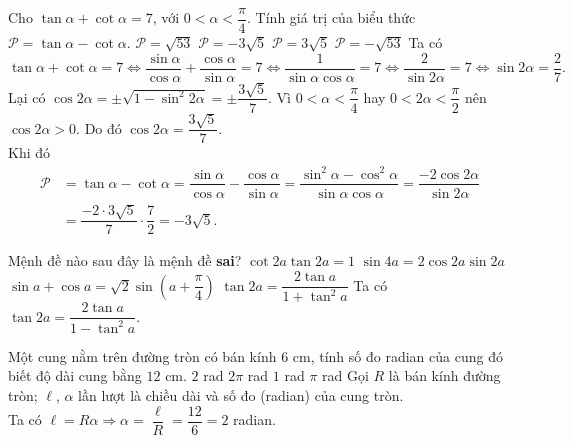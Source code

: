 \begin{ex}%
 Cho $\tan \alpha + \cot \alpha = 7$, với $0 < \alpha < \dfrac{\pi}{4}$. Tính giá trị của biểu thức $\mathscr{P} = \tan \alpha - \cot \alpha$.
 \choice
  {$\mathscr{P} = \sqrt{53}$}
  {\True $\mathscr{P} = -3\sqrt{5}$}
  {$\mathscr{P} = 3\sqrt{5}$}
  {$\mathscr{P} = -\sqrt{53}$}
 \loigiai
 {
 Ta có
 $$\tan \alpha + \cot \alpha = 7 \Leftrightarrow \dfrac{\sin \alpha}{\cos \alpha} + \dfrac{\cos \alpha}{\sin \alpha} = 7 \Leftrightarrow \dfrac{1}{\sin \alpha \cos \alpha} = 7 \Leftrightarrow \dfrac{2}{\sin 2 \alpha} = 7 \Leftrightarrow \sin 2 \alpha = \dfrac{2}{7}.$$
 Lại có $\cos 2\alpha = \pm \sqrt{1 - \sin^2 2\alpha} = \pm \dfrac{3 \sqrt{5}}{7}$. Vì $0 < \alpha < \dfrac{\pi}{4}$ hay $0 < 2 \alpha < \dfrac{\pi}{2}$ nên $\cos 2\alpha > 0$. Do đó $\cos 2 \alpha = \dfrac{3\sqrt{5}}{7}$.\\
 Khi đó
 \begin{align*}
  \mathscr{P} & = \tan \alpha - \cot \alpha = \dfrac{\sin \alpha}{\cos \alpha} - \dfrac{\cos \alpha}{\sin \alpha} = \dfrac{\sin^2 \alpha - \cos^2 \alpha}{\sin \alpha \cos \alpha} = \dfrac{-2 \cos 2\alpha}{\sin 2\alpha} \\
  & = \dfrac{-2 \cdot 3 \sqrt{5}}{7} \cdot \dfrac{7}{2} = -3\sqrt{5}.
 \end{align*}
 }
\end{ex}


\begin{ex}%
 Mệnh đề nào sau đây là mệnh đề \textbf{sai}?
 \choice
  {$\cot2a\tan2a = 1$}
  {$\sin4a = 2\cos2a\sin2a$}
  {$\sin a + \cos a = \sqrt{2}\sin \left(a + \dfrac{\pi}{4}\right)$}
  {\True $\tan2a = \dfrac{2\tan a}{1 + \tan^2 a}$}
 \loigiai
 {
 Ta có $\tan 2a = \dfrac{2\tan a}{1 - \tan^2 a}$.
 }
\end{ex}


\begin{ex}%
 Một cung nằm trên đường tròn có bán kính $6$ cm, tính số đo radian của cung đó biết độ dài cung bằng $12$ cm.
 \choice
  {\True $2$ rad}
  {$2\pi$ rad}
  {$1$ rad}
  {$\pi$ rad}
 \loigiai
 {
 Gọi $R$ là bán kính đường tròn; $\ell$, $\alpha$ lần lượt là chiều dài và số đo (radian) của cung tròn.\\
 Ta có $\ell = R \alpha \Rightarrow \alpha = \dfrac{\ell}{R} = \dfrac{12}{6} = 2$ radian.
 }
\end{ex}


